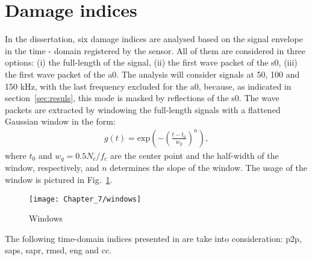 \section{Damage indices}
\label{sec:di}

In the dissertation, six damage indices are analysed based on the signal envelope in the time - domain registered by the sensor.
All of them are considered in three options: (i) the full-length of the signal, (ii) the first wave packet of the \ac{s0}, (iii) the first wave packet of the \ac{a0}.
The analysis will consider signals at 50, 100 and 150 \unit{\kHz}, with the last frequency excluded for the \ac{a0}, because, as indicated in section~\ref{sec:resuls}, this mode is masked by reflections of the \ac{s0}.
The wave packets are extracted by windowing the full-length signals with a flattened Gaussian window in the form:
\begin{eqnarray}
	g(t)= \mathrm{exp}\left(-\left(\frac{t-t_0}{w_g}\right) ^{n}\right),
	\label{eq:psi_g}
\end{eqnarray}
where \(t_0\) and \(w_g=0.5N_c/f_c\) are the center point and the half-width of the window, respectively, and  \(n\) determines the slope of the window.
The usage of the window is pictured in Fig.~\ref{fig:windows}.
\begin{figure}[!tbh]
	\begin{center}
		\texttt{[image: Chapter\_7/windows]}
	\end{center}
	\caption{Windows}
	\label{fig:windows}
\end{figure}


The following time-domain indices presented in \cite{torkamani2014novel, moix2016damage} are take into consideration: \ac{p2p}, \ac{saps}, \ac{sapr}, \acf{rmsd}, \ac{eng} and \ac{cc}.

